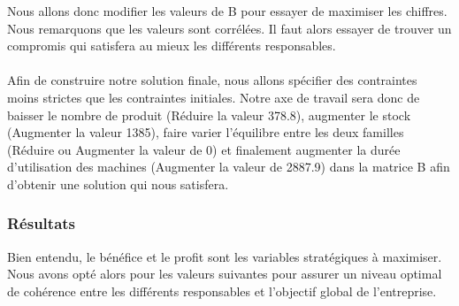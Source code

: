 \documentclass[a4paper, 11pt]{article}
\begin{document}
Nous allons donc modifier les valeurs de B pour essayer de maximiser les chiffres.
Nous remarquons que les valeurs sont corrélées. Il faut alors essayer de trouver un compromis qui satisfera au mieux les différents responsables.\\\\

Afin de construire notre solution finale, nous allons spécifier des contraintes moins strictes que les contraintes initiales. Notre axe de travail sera donc de baisser le nombre de produit (Réduire la valeur 378.8), augmenter le stock (Augmenter la valeur 1385), faire varier l'équilibre entre les deux familles (Réduire ou Augmenter la valeur de 0) et finalement augmenter la durée d'utilisation des machines (Augmenter la valeur de 2887.9) dans la matrice B afin d'obtenir une solution qui nous satisfera. 
\subsubsection{Résultats}
Bien entendu, le bénéfice et le profit sont les variables stratégiques à maximiser.  
Nous avons opté alors pour les valeurs suivantes pour assurer un niveau optimal de cohérence entre les différents responsables et l'objectif global de l'entreprise. 
\end{document}
